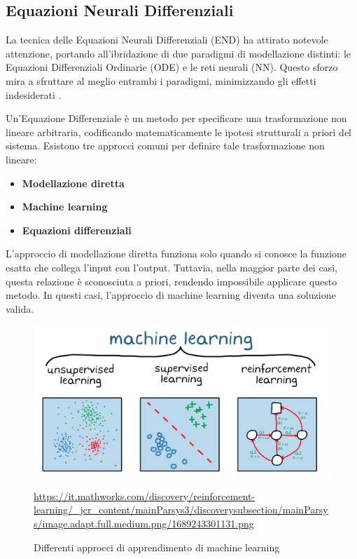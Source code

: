 \subsection{Equazioni Neurali Differenziali}

La tecnica delle Equazioni Neurali Differenziali 
(END) ha attirato notevole attenzione, portando all'ibridazione di due 
paradigmi di modellazione distinti: le Equazioni Differenziali Ordinarie 
(ODE) e le reti neurali (NN). Questo sforzo mira a sfruttare al meglio 
entrambi i paradigmi, minimizzando gli effetti indesiderati \cite{chen2019neural} \cite{Kim_2021}.

Un'Equazione Differenziale è un metodo per specificare una trasformazione 
non lineare arbitraria, codificando matematicamente le ipotesi strutturali 
a priori del sistema. Esistono tre approcci comuni per definire tale 
trasformazione non lineare:

\begin{itemize}
    \item \textbf{Modellazione diretta}
    \item \textbf{Machine learning}
    \item \textbf{Equazioni differenziali}
\end{itemize}

L'approccio di modellazione diretta funziona solo quando si conosce 
la funzione esatta che collega l'input con l'output. Tuttavia, nella 
maggior parte dei casi, questa relazione è sconosciuta a priori, 
rendendo impossibile applicare questo metodo. In questi casi, l'approccio 
di machine learning diventa una soluzione valida.

\begin{figure}[H]
    \begin{center}
        \includegraphics[width=\textwidth]{img/1689243301131.png}
        \caption{Differenti approcci di apprendimento di machine learning}
        \url{https://it.mathworks.com/discovery/reinforcement-learning/_jcr_content/mainParsys3/discoverysubsection/mainParsys/image.adapt.full.medium.png/1689243301131.png}
        \label{fig:ML_example}
    \end{center}
\end{figure}

